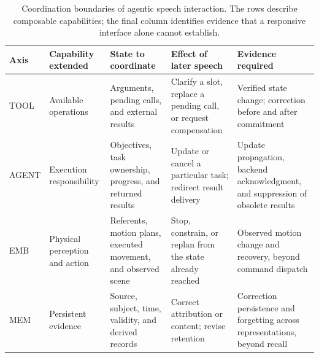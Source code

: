 \begin{table}[t]
\centering
\caption{Coordination boundaries of agentic speech interaction. The rows describe composable capabilities; the final column identifies evidence that a responsive interface alone cannot establish.}
\label{tab:agentic-capability-axes}
\small
\renewcommand{\arraystretch}{1.18}
\begin{tabularx}{\textwidth}{@{}p{}*{4}{>{\raggedright\arraybackslash}X}@{}}
\toprule
\textbf{Axis} & \textbf{Capability extended} & \textbf{State to coordinate} & \textbf{Effect of later speech} & \textbf{Evidence required} \\
\midrule
TOOL & Available operations & Arguments, pending calls, and external results & Clarify a slot, replace a pending call, or request compensation & Verified state change; correction before and after commitment \\
AGENT & Execution responsibility & Objectives, task ownership, progress, and returned results & Update or cancel a particular task; redirect result delivery & Update propagation, backend acknowledgment, and suppression of obsolete results \\
EMB & Physical perception and action & Referents, motion plans, executed movement, and observed scene & Stop, constrain, or replan from the state already reached & Observed motion change and recovery, beyond command dispatch \\
MEM & Persistent evidence & Source, subject, time, validity, and derived records & Correct attribution or content; revise retention & Correction persistence and forgetting across representations, beyond recall \\
\bottomrule
\end{tabularx}
\end{table}
